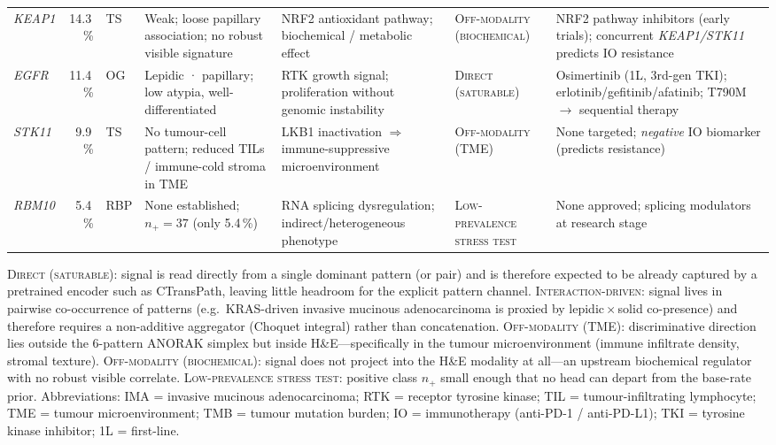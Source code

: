 \begin{table}[!htbp]
{\begin{tabular}{@{} l r l p{2.6cm} p{2.6cm} l p{2.6cm} @{}}
\textit{KEAP1} & 14.3\,\% & TS  &
Weak; loose papillary association; no robust visible signature &
NRF2 antioxidant pathway; biochemical / metabolic effect &
\textsc{Off-modality (biochemical)} &
NRF2 pathway inhibitors (early trials); concurrent
\textit{KEAP1/STK11} predicts IO resistance
\\[3pt]

\textit{EGFR}  & 11.4\,\% & OG  &
Lepidic · papillary; low atypia, well-differentiated &
RTK growth signal; proliferation without genomic instability &
\textsc{Direct (saturable)} &
Osimertinib (1L, 3rd-gen TKI); erlotinib/\allowbreak gefitinib/\allowbreak afatinib;
T790M $\to$ sequential therapy
\\[3pt]

\textit{STK11} & 9.9\,\% & TS  &
No tumour-cell pattern; reduced TILs / immune-cold stroma in TME &
LKB1 inactivation $\Rightarrow$ immune-suppressive
microenvironment &
\textsc{Off-modality (TME)} &
None targeted; \emph{negative} IO biomarker (predicts resistance)
\\[3pt]

\textit{RBM10} & 5.4\,\% & RBP &
None established; $n_+ = 37$ (only 5.4\,\%) &
RNA splicing dysregulation; indirect/heterogeneous phenotype &
\textsc{Low-prevalence stress test} &
None approved; splicing modulators at research stage
\\

\bottomrule
\end{tabular}}
\begin{flushleft}
\scriptsize
\textsc{Direct (saturable)}: signal is read directly from a single
dominant pattern (or pair) and is therefore expected to be already
captured by a pretrained encoder such as CTransPath, leaving little
headroom for the explicit pattern channel.
\textsc{Interaction-driven}: signal lives in pairwise co-occurrence
of patterns (e.g.\ KRAS-driven invasive mucinous adenocarcinoma is
proxied by lepidic\,$\times$\,solid co-presence) and therefore
requires a non-additive aggregator (Choquet integral) rather than
concatenation.
\textsc{Off-modality (TME)}: discriminative direction lies outside
the 6-pattern ANORAK simplex but inside H\&E---specifically in the
tumour microenvironment (immune infiltrate density, stromal
texture).
\textsc{Off-modality (biochemical)}: signal does not project into
the H\&E modality at all---an upstream biochemical regulator with no
robust visible correlate.
\textsc{Low-prevalence stress test}: positive class $n_+$ small
enough that no head can depart from the base-rate prior.
Abbreviations: IMA = invasive mucinous adenocarcinoma;
RTK = receptor tyrosine kinase;
TIL = tumour-infiltrating lymphocyte;
TME = tumour microenvironment;
TMB = tumour mutation burden;
IO = immunotherapy (anti-PD-1 / anti-PD-L1);
TKI = tyrosine kinase inhibitor;
1L = first-line.
\end{flushleft}
\end{table}

